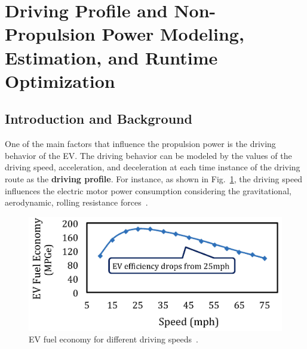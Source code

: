 \section{Driving Profile and Non-Propulsion Power Modeling, Estimation, and Runtime Optimization} \label{sec:driving_profile}

\subsection{Introduction and Background}

%
%

One of the main factors that influence the propulsion power is the driving behavior of the EV. The driving behavior can be modeled by the values of the driving speed, acceleration, and deceleration at each time instance of the driving route as the \textbf{driving profile}. For instance, as shown in Fig.~\ref{AF_image1}, the driving speed influences the electric motor power consumption considering the gravitational, aerodynamic, rolling resistance forces~\cite{AF_6}. 

\begin{figure}
\centering
\includegraphics[width=0.7\hsize]{Figures/Al_Faruque/AF_figure1.jpeg}
\caption{EV fuel economy for different driving speeds~\cite{AF_11,AF_10}.}
\label{AF_image1}
\end{figure}      


